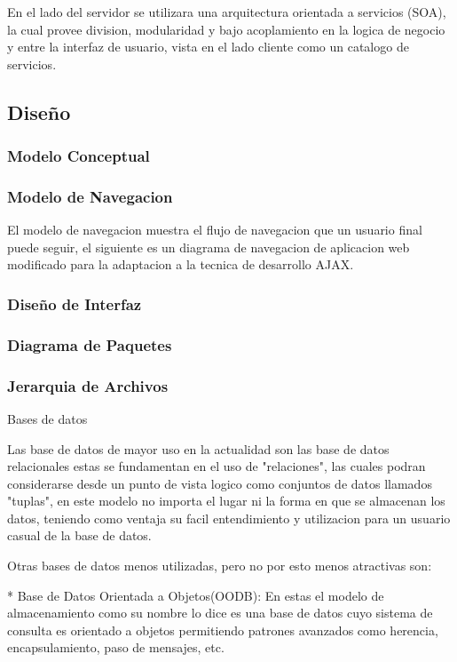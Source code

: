 En el lado del servidor se utilizara una arquitectura orientada a servicios (SOA), la cual provee division, modularidad y bajo acoplamiento en la logica de negocio y entre la interfaz de usuario, vista en el lado cliente como un catalogo de servicios.


\subsection{Diseño}
\subsubsection{Modelo Conceptual}

\subsubsection{Modelo de Navegacion}




El modelo de navegacion muestra el flujo de navegacion que un usuario final puede seguir, el siguiente es un diagrama de navegacion de aplicacion web modificado para la adaptacion a la tecnica de desarrollo AJAX.


\subsubsection{Diseño de Interfaz}


\subsubsection{Diagrama de Paquetes}


\subsubsection{Jerarquia de Archivos}

Bases de datos

Las base de datos de mayor uso en la actualidad son las base de datos relacionales estas se fundamentan en el uso de "relaciones", las cuales podran considerarse desde un punto de vista logico como conjuntos de datos llamados "tuplas", en este modelo no importa el lugar ni la forma en que se almacenan los datos, teniendo como ventaja su facil entendimiento y utilizacion para un usuario casual de la base de datos.

Otras bases de datos menos utilizadas, pero no por esto menos atractivas son:

* Base de Datos Orientada a Objetos(OODB): En estas el modelo de almacenamiento como su nombre lo dice es una base de datos cuyo sistema de consulta es orientado a objetos permitiendo patrones avanzados como herencia, encapsulamiento, paso de mensajes, etc.

